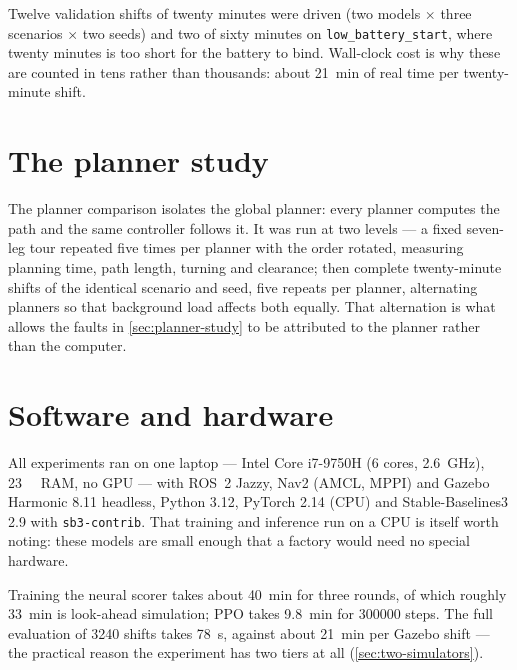 Twelve validation shifts of twenty minutes were driven (two models $\times$ three scenarios
$\times$ two seeds) and two of sixty minutes on \texttt{low\_battery\_start}, where twenty minutes
is too short for the battery to bind. Wall-clock cost is why these are counted in tens rather than
thousands: about \SI{21}{\minute} of real time per twenty-minute shift.

\section{The planner study}
\label{sec:planner-setup}

The planner comparison isolates the global planner: every planner computes the path and the same
controller follows it. It was run at two levels --- a fixed seven-leg tour repeated five times per
planner with the order rotated, measuring planning time, path length, turning and clearance; then
complete twenty-minute shifts of the identical scenario and seed, five repeats per planner,
alternating planners so that background load affects both equally. That alternation is what allows
the faults in \cref{sec:planner-study} to be attributed to the planner rather than the computer.

\section{Software and hardware}
\label{sec:hardware}

All experiments ran on one laptop --- Intel Core i7-9750H (6 cores, \SI{2.6}{\giga\hertz}),
\SI{23}{\gibi\byte} RAM, no GPU --- with ROS~2 Jazzy, Nav2 (AMCL, MPPI) and Gazebo Harmonic
\num{8.11} headless, Python \num{3.12}, PyTorch \num{2.14} (CPU) and Stable-Baselines3 \num{2.9}
with \texttt{sb3-contrib}. That training and inference run on a CPU is itself worth noting: these
models are small enough that a factory would need no special hardware.

Training the neural scorer takes about \SI{40}{\minute} for three rounds, of which roughly
\SI{33}{\minute} is look-ahead simulation; PPO takes \SI{9.8}{\minute} for \num{300000} steps. The
full evaluation of \num{3240} shifts takes \SI{78}{\second}, against about \SI{21}{\minute} per
Gazebo shift --- the practical reason the experiment has two tiers at all
(\cref{sec:two-simulators}).
